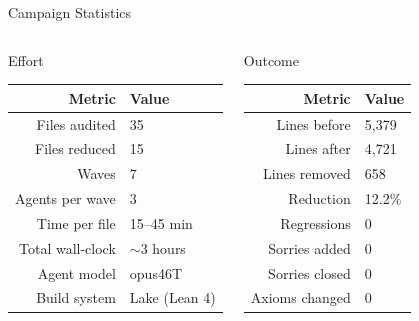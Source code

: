 \documentclass[aspectratio=169,10pt]{beamer}
\begin{document}
\begin{frame}{Campaign Statistics}
    \vspace{-0.3em}
    \begin{columns}[T]
        \begin{block}{Effort}
            \begin{tabular}{rl}
                \toprule
                \textbf{Metric} & \textbf{Value} \\
                \midrule
                Files audited & 35 \\
                Files reduced & 15 \\
                Waves & 7 \\
                Agents per wave & 3 \\
                Time per file & 15--45 min \\
                Total wall-clock & ${\sim}$3 hours \\
                Agent model & opus46T \\
                Build system & Lake (Lean 4) \\
                \bottomrule
            \end{tabular}
        \end{block}

        \begin{block}{Outcome}
            \begin{tabular}{rl}
                \toprule
                \textbf{Metric} & \textbf{Value} \\
                \midrule
                Lines before & 5{,}379 \\
                Lines after & 4{,}721 \\
                Lines removed & \textcolor{leangreen}{658} \\
                Reduction & \textcolor{leangreen}{12.2\%} \\
                Regressions & \textcolor{leangreen}{0} \\
                Sorries added & \textcolor{leangreen}{0} \\
                Sorries closed & \textcolor{leangreen}{0} \\
                Axioms changed & \textcolor{leangreen}{0} \\
                \bottomrule
            \end{tabular}
        \end{block}
    \end{columns}


\end{frame}
\end{document}
